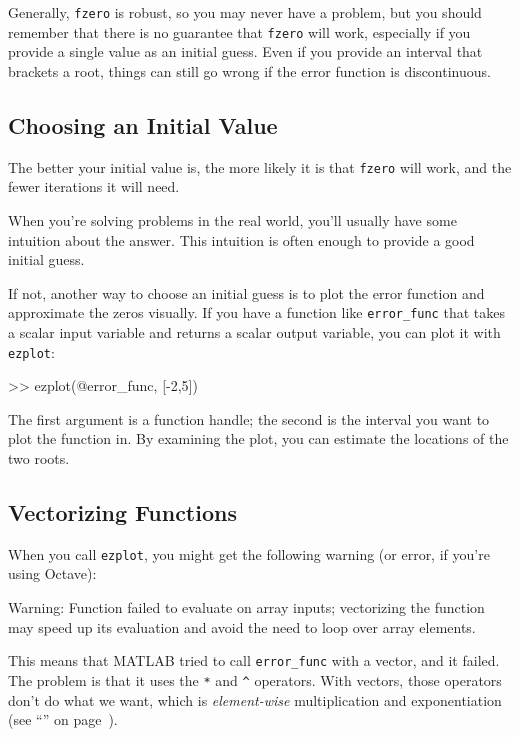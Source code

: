 Generally, \lstinline{fzero} is robust, so you may never have a problem, but you should remember that there is no guarantee that \lstinline{fzero} will work, especially  if you provide a single value as an initial guess.  Even if you provide an interval that brackets a root, things can still go wrong if the error function is discontinuous.


\subsection{Choosing an Initial Value}

The better your initial value is, the more likely it is that
\lstinline{fzero} will work, and the fewer iterations it will
need.

When you're solving problems in the real world, you'll usually
have some intuition about the answer.  This intuition is often enough
to provide  a good initial guess.


If not, another way to choose an initial guess is to plot the error function and
approximate the zeros visually.  If you have a function like
\lstinline{error_func} that takes a scalar input variable and returns
a scalar output variable, you can plot it with \lstinline{ezplot}:

\begin{code}
>> ezplot(@error_func, [-2,5])
\end{code}

The first argument is a function handle; the second is the interval you want to plot the function in.
By examining the plot, you can estimate the locations of the two roots.


\subsection{Vectorizing Functions}


When you call \lstinline{ezplot}, you might get the following warning (or error, if you're using Octave):

\begin{code}
Warning: Function failed to evaluate on array inputs;
vectorizing the function may speed up its evaluation and
avoid the need to loop over array elements.
\end{code}

This means that MATLAB tried to call \lstinline{error_func} with a vector, and it failed.
The problem is that it uses the \lstinline{*} and \lstinline{^} operators.  With vectors, those operators don't do what we want, which is \emph{element-wise} multiplication and exponentiation
(see ``'' on page~\pageref{elementwise}).

